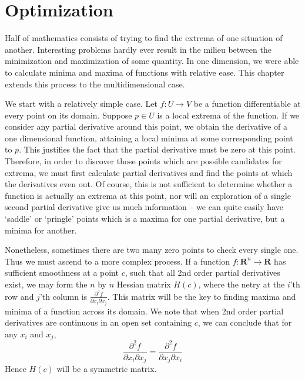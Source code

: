\documentclass[12pt]{amsbook}
\theoremstyle{plain}
\theoremstyle{definition}
\begin{document}
\chapter{Optimization}

Half of mathematics consists of trying to find the extrema of one situation of another. Interesting problems hardly ever result in the milieu between the minimization and maximization of some quantity. In one dimension, we were able to calculate minima and maxima of functions with relative ease. This chapter extends this process to the multidimensional case.

We start with a relatively simple case. Let $f:U \to V$ be a function differentiable at every point on its domain. Suppose $p \in U$ is a local extrema of the function. If we consider any partial derivative around this point, we obtain the derivative of a one dimensional function, attaining a local minima at some corresponding point to $p$. This justifies the fact that the partial derivative must be zero at this point. Therefore, in order to discover those points which are possible candidates for extrema, we must first calculate partial derivatives and find the points at which the derivatives even out. Of course, this is not sufficient to determine whether a function is actually an extrema at this point, nor will an exploration of a single second partial derivative give us much information -- we can quite easily have `saddle' or `pringle' points which is a maxima for one partial derivative, but a minima for another.


Nonetheless, sometimes there are two many zero points to check every single one. Thus we must ascend to a more complex process. If a function $f:\mathbf{R}^n \to \mathbf{R}$ has sufficient smoothness at a point $c$, such that all 2nd order partial derivatives exist, we may form the $n$ by $n$ Hessian matrix $H(c)$, where the netry at the $i$'th row and $j$'th column is $\frac{\partial^2 f}{\partial x_i \partial x_j}$. This matrix will be the key to finding maxima and minima of a function across its domain. We note that when 2nd order partial derivatives are continuous in an open set containing $c$, we can conclude that for any $x_i$ and $x_j$,
%
\[ \frac{\partial^2 f}{\partial x_i \partial x_j} = \frac{\partial^2 f}{\partial x_j \partial x_i} \]
%
Hence $H(c)$ will be a symmetric matrix.
\end{document}
